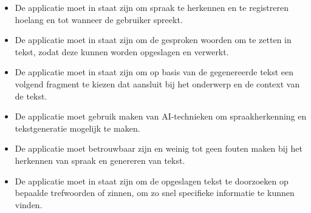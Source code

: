 \begin{itemize}
    \item De applicatie moet in staat zijn om spraak te herkennen en te registreren hoelang en tot wanneer de gebruiker spreekt.
    \item De applicatie moet in staat zijn om de gesproken woorden om te zetten in tekst, zodat deze kunnen worden opgeslagen en verwerkt.
    \item De applicatie moet in staat zijn om op basis van de gegenereerde tekst een volgend fragment te kiezen dat aansluit bij het onderwerp en de context van de tekst.
    \item De applicatie moet gebruik maken van AI-technieken om spraakherkenning en tekstgeneratie mogelijk te maken.
    \item De applicatie moet betrouwbaar zijn en weinig tot geen fouten maken bij het herkennen van spraak en genereren van tekst.
    \item  De applicatie moet in staat zijn om de opgeslagen tekst te doorzoeken op bepaalde trefwoorden of zinnen, om zo snel specifieke informatie te kunnen vinden.
\end{itemize}

\subsection{}

